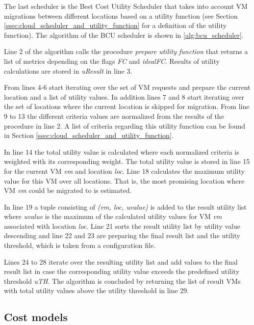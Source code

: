 The last scheduler is the Best Cost Utility Scheduler that takes into account VM migrations between different locations based on a utility function (see Section \ref{ssec:cloud_scheduler_and_utility_function} for a definition of the utility function). 
The algorithm of the BCU scheduler is shown in \ref{alg:bcu_scheduler}. 

Line 2 of the algorithm calls the procedure \textit{prepare utility function} that returns a list of metrics depending on the flags \textit{FC} and \textit{idealFC}. Results of utility calculations are stored in \textit{uResult} in line 3. 

From lines 4-6 start iterating over the set of VM requests and prepare the current location and a list of utility values. In addition lines 7 and 8 start iterating over the set of locations where the current location is skipped for migration. From line 9 to 13 the different criteria values are normalized from the results of the procedure in line 2. A list of criteria regarding this utility function can be found in Section \ref{ssec:cloud_scheduler_and_utility_function}. 

In line 14 the total utility value is calculated where each normalized criteria is weighted with its corresponding weight. The total utility value  is stored in line 15 for the current VM \textit{vm} and location \textit{loc}. Line 18 calculates the maximum utility value for this VM over all locations. That is, the most promising location where VM \textit{vm} could be migrated to is estimated. 

In line 19 a tuple consisting of \textit{(vm, loc, uvalue)} is added to the result utility list where \textit{uvalue} is the maximum of the calculated utility values for VM \textit{vm} associated with location \textit{loc}. 
Line 21 sorts the result utility list by utility value descending and line 22 and 23 are preparing the final result list and the utility threshold, which is taken from a configuration file. 

Lines 24 to 28 iterate over the resulting utility list and add values to the final result list in case the corresponding utility value exceeds the predefined utility threshold \textit{uTH}. 
The algorithm is concluded by returning the list of result VMs with total utility values above the utility threshold in line 29. 



\subsection{Cost models} \label{ssec:cost_model_definitions}

